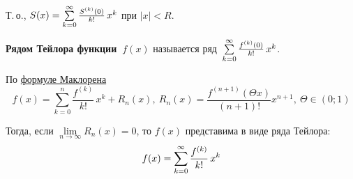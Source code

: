 Т.\,о., $S(x) = \series[0] \frac{S^{(k)}(0)}{k!}\,x^k$ при $|x| < R$.

 \textbf{Рядом Тейлора функции~$f(x)$} называется ряд~$\series[0] \frac{f^{(k)}(0)}{k!}\,x^k$.

По \hyperref[eq:Maclaurin_series]{формуле Маклорена}
\begin{equation*}
f(x) = \sum_{k=0}^n \frac{f^{(k)}}{k!}\,x^k + R_n(x), \
R_n(x) = \frac{f^{(n + 1)}(\Theta x)}{(n + 1)!} x^{n + 1}, \
\Theta \in (0; 1)
\end{equation*}

Тогда, если $\lim\limits_{n \to \infty} R_n(x) = 0$, то $f(x)$ представима в виде ряда Тейлора:
\begin{equation*}
f(x) = \series[0] \frac{f^{(k)}}{k!}\,x^k
\end{equation*}


